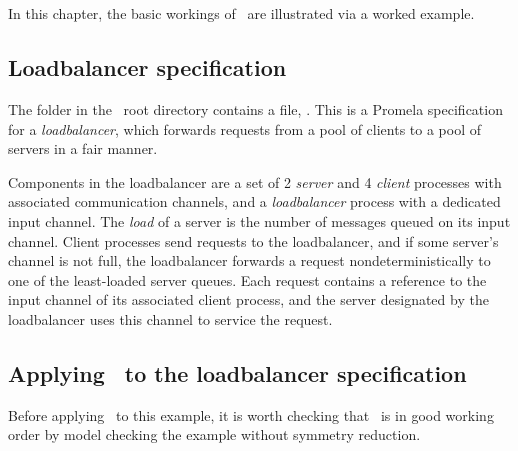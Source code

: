 \chapter{\workedexample}\label{chapter:example}

In this chapter, the basic workings of \topspin\ are illustrated via
a worked example.

\section{Loadbalancer specification}

The  folder in the \topspin\ root directory
contains a file, .  This is a Promela
specification for a \emph{loadbalancer}, which forwards requests
from a pool of clients to a pool of servers in a fair manner.

Components in the loadbalancer are a set of 2 \emph{server} and 4
\emph{client} processes with associated communication channels, and
a \emph{loadbalancer} process with a dedicated input channel.  The
\emph{load} of a server is the number of messages queued on its
input channel.  Client processes send requests to the loadbalancer,
and if some server's channel is not full, the loadbalancer forwards
a request nondeterministically to one of the least-loaded server
queues. Each request contains a reference to the input channel of
its associated client process, and the server designated by the
loadbalancer uses this channel to service the request.

\section{Applying \protect\spin\ to the loadbalancer specification}\label{sec:example:applyingspin}

Before applying \topspin\ to this example, it is worth checking that
\spin\ is in good working order by model checking the example
without symmetry reduction.

